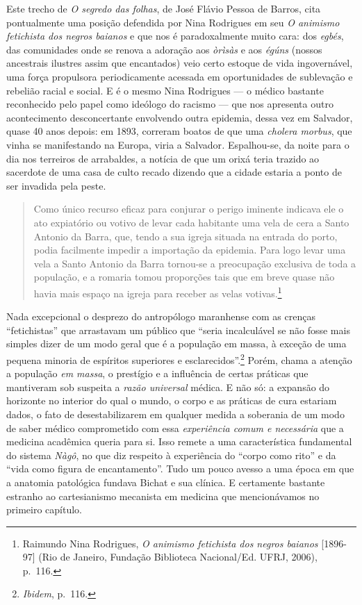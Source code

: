 Este trecho de \textit{O segredo das folhas}, de José Flávio Pessoa de
Barros, cita pontualmente uma posição defendida por Nina Rodrigues em
seu \textit{O animismo fetichista dos negros baianos} e que nos é
paradoxalmente muito cara: dos \textit{egbés}, das comunidades onde se
renova a adoração aos \textit{òrìsàs} e aos \textit{égúns} (nossos
ancestrais ilustres assim que encantados) veio certo estoque de vida
ingovernável, uma força propulsora periodicamente acessada em
oportunidades de sublevação e rebelião racial e social. E é o mesmo Nina
Rodrigues --- o médico bastante reconhecido pelo papel como ideólogo do
racismo --- que nos apresenta outro acontecimento desconcertante
envolvendo outra epidemia, dessa vez em Salvador, quase 40 anos depois:
em 1893, correram boatos de que uma \textit{cholera morbus}, que vinha se
manifestando na Europa, viria a Salvador\textit{.} Espalhou-se, da noite
para o dia nos terreiros de arrabaldes, a notícia de que um orixá teria
trazido ao sacerdote de uma casa de culto recado dizendo que a cidade
estaria a ponto de ser invadida pela peste.

\begin{quote}
Como único recurso eficaz para conjurar o perigo iminente indicava ele o
ato expiatório ou votivo de levar cada habitante uma vela de cera a
Santo Antonio da Barra, que, tendo a sua igreja situada na entrada do
porto, podia facilmente impedir a importação da epidemia. Para logo
levar uma vela a Santo Antonio da Barra tornou-se a preocupação
exclusiva de toda a população, e a romaria tomou proporções tais que em
breve quase não havia mais espaço na igreja para receber as velas
votivas.\footnote{Raimundo Nina Rodrigues, \textit{O animismo fetichista
  dos negros baianos} {[}1896-97{]} (Rio de Janeiro, Fundação Biblioteca
  Nacional/Ed. UFRJ, 2006), p.~116.}
\end{quote}

Nada excepcional o desprezo do antropólogo maranhense com as crenças
``fetichistas'' que arrastavam um público que ``seria incalculável se
não fosse mais simples dizer de um modo geral que é a população em
massa, à exceção de uma pequena minoria de espíritos superiores e
esclarecidos''.\footnote{\textit{Ibidem}, p.~116.} Porém, chama a atenção
a população \textit{em massa}, o prestígio e a influência de certas
práticas que mantiveram sob suspeita a \textit{razão universal} médica. E
não só: a expansão do horizonte no interior do qual o mundo, o corpo e
as práticas de cura estariam dados, o fato de desestabilizarem em
qualquer medida a soberania de um modo de saber médico comprometido com
essa \textit{experiência comum e necessária} que a medicina acadêmica
queria para si. Isso remete a uma característica fundamental do sistema
\textit{Nàgô}, no que diz respeito à experiência do ``corpo como rito'' e
da ``vida como figura de encantamento''. Tudo um pouco avesso a uma
época em que a anatomia patológica fundava Bichat e sua clínica. E
certamente bastante estranho ao cartesianismo mecanista em medicina que
mencionávamos no primeiro capítulo.

